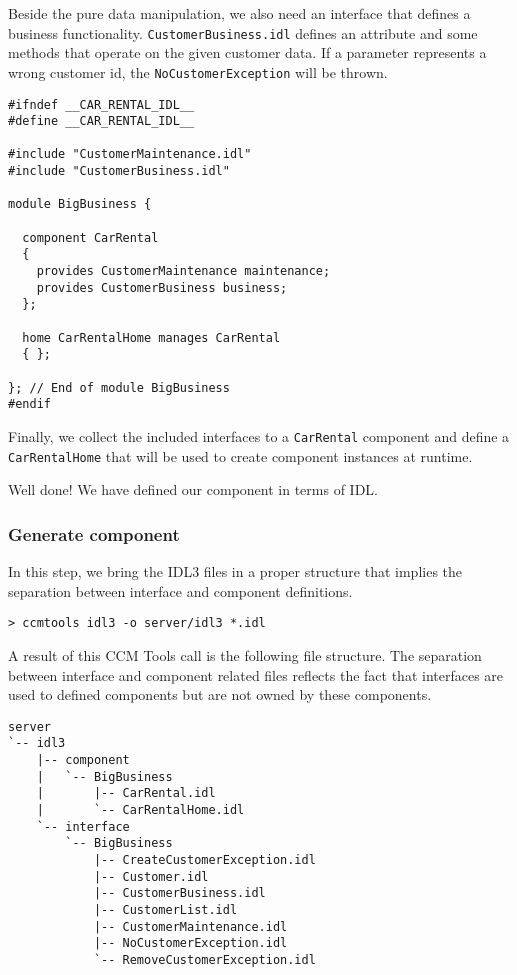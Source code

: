 Beside the pure data manipulation, we also need an interface that defines a
business functionality.
{\tt CustomerBusiness.idl} defines an attribute and some methods that operate
on the given customer data. 
If a parameter represents a wrong customer id, the {\tt NoCustomerException}
will be thrown.

\begin{small}
\begin{verbatim}
#ifndef __CAR_RENTAL_IDL__
#define __CAR_RENTAL_IDL__

#include "CustomerMaintenance.idl"
#include "CustomerBusiness.idl"

module BigBusiness {

  component CarRental 
  { 
    provides CustomerMaintenance maintenance;
    provides CustomerBusiness business;
  };
  
  home CarRentalHome manages CarRental 
  { };

}; // End of module BigBusiness
#endif
\end{verbatim}
\end{small}

Finally, we collect the included interfaces to a {\tt CarRental} component and 
define a {\tt CarRentalHome} that will be used to create component instances at
runtime.

Well done! We have defined our component in terms of IDL.


\vspace{10mm}
\subsubsection{Generate component}

In this step, we bring the IDL3 files in a proper structure that implies 
the separation between interface and component definitions. 
\begin{small}
\begin{verbatim}
> ccmtools idl3 -o server/idl3 *.idl
\end{verbatim}
\end{small}
A result of this CCM Tools call is the following file structure.
The separation between interface and component related files reflects the
fact that interfaces are used to defined components but are not owned by
these components.
\begin{small}
\begin{verbatim}
server
`-- idl3
    |-- component
    |   `-- BigBusiness
    |       |-- CarRental.idl
    |       `-- CarRentalHome.idl
    `-- interface
        `-- BigBusiness
            |-- CreateCustomerException.idl
            |-- Customer.idl
            |-- CustomerBusiness.idl
            |-- CustomerList.idl
            |-- CustomerMaintenance.idl
            |-- NoCustomerException.idl
            `-- RemoveCustomerException.idl
\end{verbatim}
\end{small}


